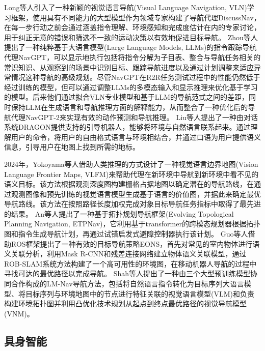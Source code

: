 	Long\cite{long2024discuss}等人引入了一种新颖的视觉语言导航(Visual Language Navigation, VLN)学习框架，使用具有不同能力的大型模型作为领域专家构建了导航代理DiscussNav，在每一步行动之前会通过涵盖指令理解、环境感知和完成度估计在内的专家讨论，用于纠正无意的错误和筛选不一致的运动决策以有效地促进目标导航。
	Zhou\cite{zhou2024navgpt1}等人提出了一种纯粹基于大语言模型(Large Language Models, LLMs)的指令跟踪导航代理NavGPT，可以显示地执行包括将指令分解为子目表、整合与导航任务相关的常识知识、从观察到的场景中识别目标、跟踪导航进度以及通过计划调整来适应异常情况这种导航的高级规划。尽管NavGPT在R2R任务测试过程中的性能仍然低于经过训练的模型，但可以通过调整LLMs的多模态输入和显示推理来优化基于学习的模型。后来他们通过拟合VLN专业模型和基于LLM的导航范式之间的差距，同时保持LLM在生成语言和导航推理方面的解释能力，从而整合了一种优化后的导航代理NavGPT-2\cite{zhou2024navgpt2}来实现有效的动作预测和导航推理。
	Liu\cite{liu2024dragon}等人提出了一种由对话系统DRAGON提供支持的引导机器人，能够将环境与自然语言联系起来。通过理解用户的命令，将用户的自由格式语言与环境相结合，并通过口语为用户提供语义信息，引导用户在地图上找到所需的地标。
    
	2024年，Yokoyama\cite{yokoyama2024vlfm}等人借助人类推理的方式设计了一种视觉语言边界地图(Vision Language Frontier Maps, VLFM)来帮助代理在新环境中导航到新环境中看不见的语义目标。该方法根据观测深度图构建栅格占据地图以确定潜在的导航路线，在通过观测图像和预先训练的视觉语言模型生成基于语言的价值图，并据此来确定最优导航路线。该方法在按照路径长度加权完成对象目标导航任务指标中取得了最先进的结果。
	An\cite{an2024etpnav}等人提出了一种基于拓扑规划导航框架(Evolving Topological Planning Navigation, ETPNav)，它利用基于transformer的跨模态规划器根据拓扑图和指令生成导航计划，再通过试错启发式避障控制器执行该计划。
	Guo\cite{electronics11071136}等人借助ROS框架提出了一种有效的目标导航策略EONS，首先对常见的室内物体进行语义关联分析，利用Mask R-CNN和残差连接网络建立物体语义关联模型，通过ROB-SLAM系统方法构建了一个高可用性的环境图，在移动机器人导航的过程中寻找可达的最优路径以完成导航。
    Shah\cite{shah2021ving, shah2023lm}等人提出了一种由三个大型预训练模型协同合作构成的LM-Nav导航方法，包括将自然语言指令转化为目标序列大语言模型、将目标序列与环境地图中的节点进行特征关联的视觉语言模型(VLM)和负责构建环境拓扑图并利用凸优化技术规划从起点到终点最优路径的视觉导航模型(VNM)。

\subsection{具身智能}

